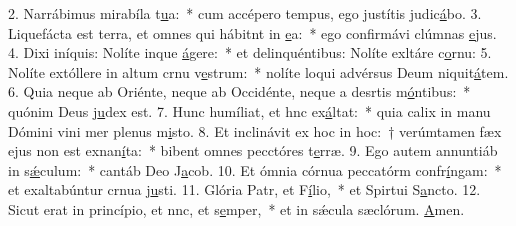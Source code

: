 2. Narrábimus mirabíla t\uline{u}a:~* cum accépero tempus, ego justítis judic\uline{á}bo.
3. Liquefácta est terra, et omnes qui hábitnt in \uline{e}a:~* ego confirmávi clúmnas \uline{e}jus.
4. Dixi iníquis: Nolíte inque \uline{á}gere:~* et delinquéntibus: Nolíte exltáre c\uline{o}rnu:
5. Nolíte extóllere in altum crnu v\uline{e}strum:~* nolíte loqui advérsus Deum niquit\uline{á}tem.
6. Quia neque ab Oriénte, neque ab Occidénte, neque a desrtis m\uline{ó}ntibus:~* quónim Deus j\uline{u}dex est.
7. Hunc humíliat, et hnc ex\uline{á}ltat:~* quia calix in manu Dómini vini mer plenus m\uline{i}sto.
8. Et inclinávit ex hoc in hoc:~† verúmtamen fæx ejus non est exnan\uline{í}ta:~* bibent omnes pecctóres t\uline{e}rræ.
9. Ego autem annuntiáb in s\uline{ǽ}culum:~* cantáb Deo J\uline{a}cob.
10. Et ómnia córnua peccatórm confr\uline{í}ngam:~* et exaltabúntur crnua j\uline{u}sti.
11. Glória Patr, et F\uline{í}lio,~* et Spirtui S\uline{a}ncto.
12. Sicut erat in princípio, et nnc, et s\uline{e}mper,~* et in sǽcula sæclórum. \uline{A}men.
